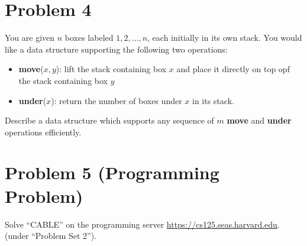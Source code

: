 \documentclass[12pt]{article}
\begin{document}
\begin{center}
\end{center}


\section*{Problem 4}
You are given $n$ boxes labeled $1,2,\ldots,n$, each initially in its own stack. You would like a data structure supporting the following two operations:
\begin{itemize}
\item \textbf{move}($x,y$): lift the stack containing box $x$ and place it directly on top opf the stack containing box $y$
\item \textbf{under}($x$): return the number of boxes under $x$ in its stack.
\end{itemize}

Describe a data structure which supports any sequence of $m$ \textbf{move} and \textbf{under} operations efficiently.


\section*{Problem 5 (Programming Problem)}
Solve ``CABLE'' on the programming server \url{https://cs125.seas.harvard.edu}.\\
(under ``Problem Set 2'').
\end{document}
